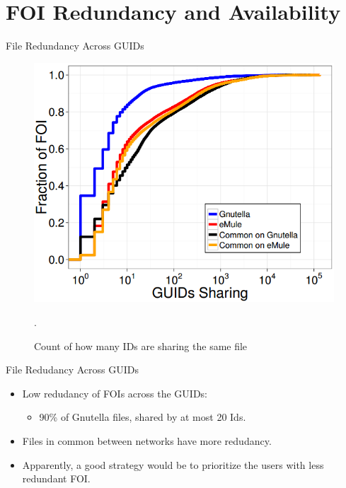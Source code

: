 \documentclass[notes]{beamer}
\begin{document}
\section{FOI Redundancy and Availability}
\begin{frame}

\begin{block}{File Redundancy Across GUIDs}

\begin{figure}[!htb]
\centering
\includegraphics[scale=0.5]{FOI_redundancy}
\caption{Count of how many IDs are sharing the same file}.
\label{fig:FOI_redundancy}
\end{figure}

\end{block}

\end{frame}

\begin{frame}

\begin{block}{File Redudancy Across GUIDs}

\begin{itemize}

\item[\checkmark]Low redudancy of FOIs across the GUIDs:
	\begin{itemize}
	
	\item 90\% of Gnutella files, shared by at most 20 Ids.
	
	\end{itemize}


\item[\checkmark]Files in common between networks have more redudancy.

\item[\checkmark]Apparently, a good strategy would be to prioritize the users with less redundant FOI.

\end{itemize}

\end{block}

\end{frame}
\end{document}
